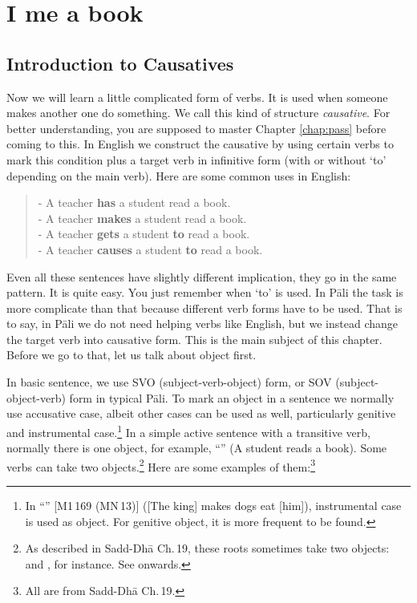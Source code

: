 \chapter{I  me a book}\label{chap:caus}

{}
\section*{Introduction to Causatives}

Now we will learn a little complicated form of verbs. It is used when someone makes another one do something. We call this kind of structure \emph{causative}. For better understanding, you are supposed to master Chapter \ref{chap:pass} before coming to this. In English we construct the causative by using certain verbs to mark this condition plus a target verb in infinitive form (with or without `to' depending on the main verb). Here are some common uses in English:

\begin{quote}
- A teacher \textbf{has} a student read a book.\\
- A teacher \textbf{makes} a student read a book.\\
- A teacher \textbf{gets} a student \textbf{to} read a book.\\
- A teacher \textbf{causes} a student \textbf{to} read a book.\\
\end{quote}

Even all these sentences have slightly different implication, they go in the same pattern. It is quite easy. You just remember when `to' is used. In P\=ali the task is more complicate than that because different verb forms have to be used. That is to say, in P\=ali we do not need helping verbs like English, but we instead change the target verb into causative form. This is the main subject of this chapter. Before we go to that, let us talk about object first.

In basic sentence, we use SVO (subject-verb-object) form, or SOV (subject-object-verb) form in typical P\=ali. To mark an object in a sentence we normally use accusative case, albeit other cases can be used as well, particularly genitive and instrumental case.\footnote{In ``'' [M1\,169 (MN\,13)] ([The king] makes dogs eat [him]), instrumental case is used as object. For genitive object, it is more frequent to be found.} In a simple active sentence with a transitive verb, normally there is one object, for example, ``'' (A student reads a book). Some verbs can take two objects.\footnote{As described in Sadd-Dh\=a Ch.\,19, these roots sometimes take two objects:  and , for instance. See  onwards.} Here are some examples of them:\footnote{All are from Sadd-Dh\=a Ch.\,19.}


